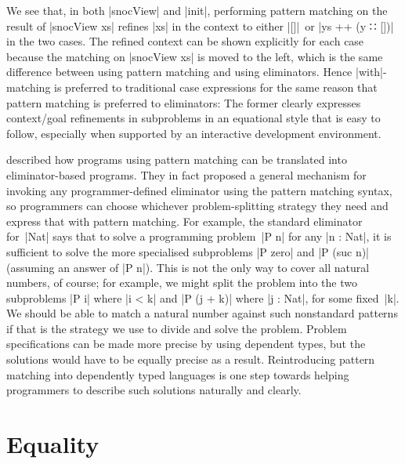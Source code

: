 We see that, in both |snocView| and |init|, performing pattern matching on the result of |snocView xs| refines |xs| in the context to either |[]|~or |ys ++ (y ∷ [])| in the two cases.
The refined context can be shown explicitly for each case because the matching on |snocView xs| is moved to the left, which is the same difference between using pattern matching and using eliminators.
Hence |with|-matching is preferred to traditional case expressions for the same reason that pattern matching is preferred to eliminators: The former clearly expresses context/goal refinements in subproblems in an equational style that is easy to follow, especially when supported by an interactive development environment.

\citet{McBride-view} described how programs using pattern matching can be translated into eliminator-based programs.
They in fact proposed a general mechanism for invoking any programmer-defined eliminator using the pattern matching syntax, so programmers can choose whichever problem-splitting strategy they need and express that with pattern matching.
For example, the standard eliminator for~|Nat| says that to solve a programming problem~|P n| for any |n : Nat|, it is sufficient to solve the more specialised subproblems |P zero| and |P (suc n)| (assuming an answer of |P n|).
This is not the only way to cover all natural numbers, of course; for example, we might split the problem into the two subproblems |P i| where |i < k| and |P (j + k)| where |j : Nat|, for some fixed~|k|.
We should be able to match a natural number against such nonstandard patterns if that is the strategy we use to divide and solve the problem.
Problem specifications can be made more precise by using dependent types, but the solutions would have to be equally precise as a result.
Reintroducing pattern matching into dependently typed languages is one step towards helping programmers to describe such solutions naturally and clearly.

\section{Equality}
\label{sec:equality}

